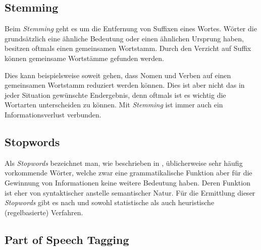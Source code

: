 
\subsection{Stemming}


Beim \textit{Stemming} geht es um die Entfernung von Suffixen eines Wortes. Wörter die grundsätzlich eine ähnliche Bedeutung oder einen ähnlichen Ursprung haben, besitzen oftmals einen gemeinsamen Wortstamm. Durch den Verzicht auf Suffix können gemeinsame Wort\-stäm\-me gefunden werden.
\\\cite{porter1980algorithm}

Dies kann beispielsweise soweit gehen, dass Nomen und Verben auf einen gemeinsamen Wortstamm reduziert werden können. Dies ist aber nicht das in jeder Situation gewünschte Endergebnis, denn oftmals ist es wichtig die Wortarten unterscheiden zu können. Mit \textit{Stemming} ist immer auch ein Informationsverlust verbunden. 


\subsection{Stopwords}


Als \textit{Stopwords} bezeichnet man, wie beschrieben in \cite{manning2008introduction}, üblicherweise sehr häufig vorkommende Wörter, welche zwar eine grammatikalische Funktion aber für die Gewinnung von Informationen keine weitere Bedeutung haben. Deren Funktion ist eher von syntaktischer anstelle semantischer Natur. Für die Ermittlung dieser \textit{Stopwords} gibt es nach \cite{manning2008introduction} und \cite{wilbur1992automatic} sowohl statistische als auch heuristische (regelbasierte) Verfahren.


\subsection{Part of Speech Tagging}\label{part-of-speech}

